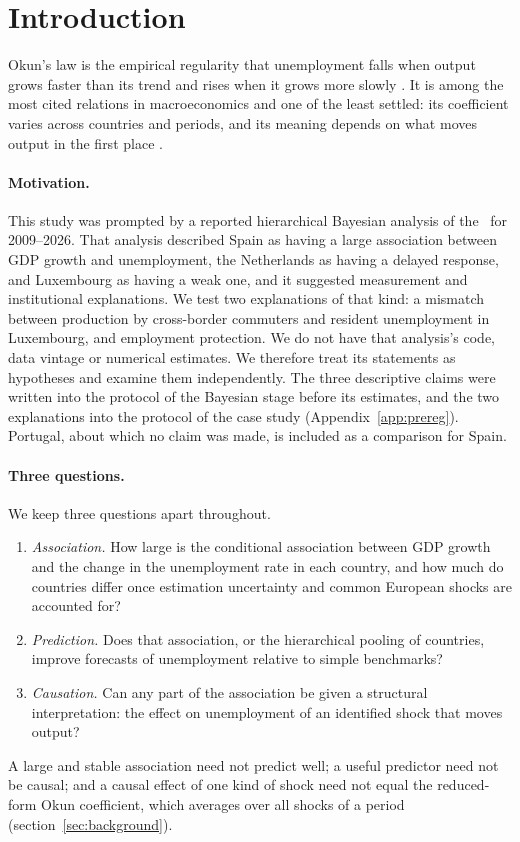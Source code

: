 \section{Introduction}\label{sec:intro}

Okun's law is the empirical regularity that unemployment falls when output grows faster
than its trend and rises when it grows more slowly \citep{okun1962}. It is among the most
cited relations in macroeconomics and one of the least settled: its coefficient varies
across countries and periods, and its meaning depends on what moves output in the first
place \citep{ball2017okun}.

\paragraph{Motivation.} This study was prompted by a reported hierarchical Bayesian analysis
of the \eu\ for 2009--2026. That analysis described Spain as having a large association
between GDP growth and unemployment, the Netherlands as having a delayed response, and
Luxembourg as having a weak one, and it suggested measurement and institutional
explanations. We test two explanations of that kind: a mismatch between production by
cross-border commuters and resident unemployment in Luxembourg, and employment
protection. We do not have that analysis's code, data vintage or numerical
estimates. We therefore treat its statements as hypotheses and examine them
independently. The three descriptive claims were written into the protocol of the
Bayesian stage before its estimates, and the two explanations into the protocol of the
case study (Appendix~\ref{app:prereg}). Portugal, about which no claim was made, is
included as a comparison for Spain.

\paragraph{Three questions.} We keep three questions apart throughout.
\begin{enumerate}
  \item \emph{Association.} How large is the conditional association between GDP growth
    and the change in the unemployment rate in each country, and how much do countries
    differ once estimation uncertainty and common European shocks are accounted for?
  \item \emph{Prediction.} Does that association, or the hierarchical pooling of
    countries, improve forecasts of unemployment relative to simple benchmarks?
  \item \emph{Causation.} Can any part of the association be given a structural
    interpretation: the effect on unemployment of an identified shock that moves output?
\end{enumerate}
A large and stable association need not predict well; a useful predictor need not be
causal; and a causal effect of one kind of shock need not equal the reduced-form Okun
coefficient, which averages over all shocks of a period (section~\ref{sec:background}).


